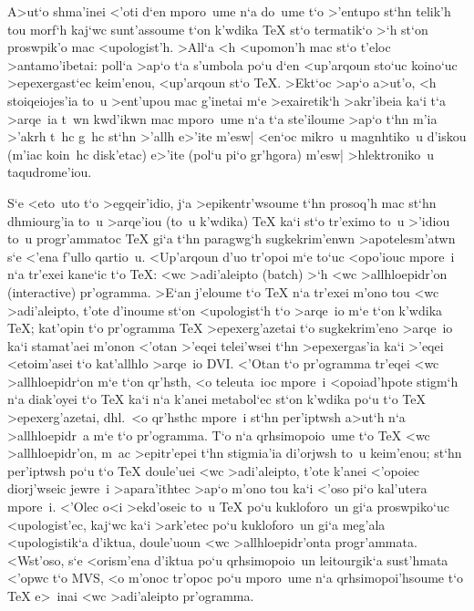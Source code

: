 A>ut`o shma'inei <'oti d`en mporo~ume n`a do~ume t`o >'entupo st`hn     
telik'h tou morf`h kaj`wc sunt'assoume t`on k'wdika {\rm \TeX} st`o     
termatik`o >`h st`on proswpik'o mac <upologist'h.  >All`a <h <upomon'h  
mac st`o t'eloc >antamo'ibetai:  poll`a >ap`o t`a s'umbola po`u d`en
<up'arqoun sto`uc koino`uc >epexergast`ec keim'enou, <up'arqoun st`o    
{\rm \TeX}\null.  >Ekt`oc >ap`o a>ut'o, <h stoiqeiojes'ia to~u >ent'upou
mac g'inetai m`e >exairetik`h >akr'ibeia ka`i t`a >arqe~ia t~wn kwd'ikwn
mac mporo~ume n`a t`a ste'iloume >ap`o t`hn m'ia >'akrh t~hc g~hc st`hn
>'allh e>'ite m'esw| <en`oc mikro~u magnhtiko~u d'iskou  (m'iac koin~hc
disk'etac) e>'ite (pol`u pi`o gr'hgora) m'esw| >hlektroniko~u
taqudrome'iou.

S`e <eto~uto t`o >egqeir'idio, j`a >epikentr'wsoume t`hn prosoq'h mac    
st`hn dhmiourg'ia to~u >arqe'iou (to~u k'wdika) {\rm \TeX} ka`i st`o    
tr'eximo to~u >'idiou to~u progr'ammatoc {\rm \TeX} gi`a t`hn paragwg`h 
sugke\-krim'enwn >apotele\-sm'atwn s`e <'ena f'ul\-lo qartio~u.     
<Up'arqoun d'uo tr'opoi m`e to`uc <opo'iouc mpore~i n`a tr'exei kane`ic 
t`o {\rm \TeX}: <wc >adi'aleipto ({\rm batch}) >`h <wc                 
>al\-lhlo\-epidr'on ({\rm interactive}) pr'ogramma.  >E`an j'eloume t`o 
 {\rm \TeX} n`a tr'exei m'ono tou <wc >adi'aleipto, t'ote d'inoume st`on
<upologist`h t`o >arqe~io m`e t`on k'wdika {\rm \TeX}; kat'opin t`o
pr'ogramma {\rm \TeX} >epexerg'azetai t`o sugkekrim'eno >arqe~io ka`i
sta\-ma\-t'a\-ei m'onon <'o\-tan >'eqei te\-lei'w\-sei t`hn
>epexergas'ia ka`i >'eqei <etoim'asei t`o kat'al\-lh\-lo >ar\-qe~io {\rm
DVI}\null.  <'Otan t`o pr'ogramma tr'eqei <wc >al\-lhlo\-epidr`on m`e
t`on qr'hsth, <o teleuta~ioc mpore~i <opoia\-d'hpote stigm`h n`a
diak'oyei t`o {\rm \TeX} ka`i n`a k'anei metabol`ec st`on k'wdika po`u
t`o {\rm \TeX} >epexer\-g'azetai, dhl.\ <o qr'hsthc mpore~i st`hn
per'iptwsh a>ut`h n`a >allhloepidr~a m`e t`o  pr'ogramma.  T`o n`a
qrhsimopoio~ume t`o {\rm \TeX} <wc >allhloepidr'on, m~ac >epitr'epei
t`hn stigmia'ia di'orjwsh to~u keim'enou; st`hn per'iptwsh po`u t`o {\rm
\TeX} doule'uei <wc >adi'aleipto, t'ote k'anei <'opoiec diorj'wseic
jewre~i >apara'ithtec >ap`o m'ono tou ka`i <'oso pi`o kal'utera mpore~i.
<'Olec o<i >ekd'oseic to~u {\rm \TeX} po`u kukloforo~un gi`a          
proswpiko`uc <upologist'ec, kaj`wc ka`i >ark'etec po`u kukloforo~un gi`a
meg'ala <upo\-lo\-gistik`a d'iktua, dou\-le'u\-oun <wc >allhlo\-epidr'onta
progr'am\-mata.  <Wst'oso, s`e <orism'ena d'iktua po`u qrhsimopoio~un   
leitourgik`a sust'hmata <'opwc t`o {\rm MVS}, <o m'onoc tr'opoc
po`u mporo~ume n`a qrhsimopoi'hsoume t`o {\rm \TeX} e>~inai <wc
>adi'aleipto pr'ogramma.

